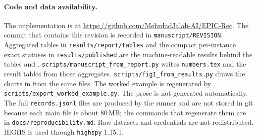 \documentclass[11pt]{article}
\begin{document}
\paragraph{Code and data availability.} The implementation is at
\url{https://github.com/MehrdadJalali-AI/EPIC-Rec}. The commit that contains this revision is recorded in
\texttt{manuscript/REVISION}. Aggregated tables in \texttt{results/report/tables} and the compact per-instance
exact statuses in \texttt{results/published} are the machine-readable results behind the tables and
. \texttt{scripts/manuscript\_from\_report.py} writes \texttt{numbers.tex} and the result tables
from those aggregates. \texttt{scripts/fig1\_from\_results.py} draws the charts in  from the same
files. The worked example is regenerated by \texttt{scripts/export\_worked\_example.py}. The prose is not generated
automatically. The full \texttt{records.jsonl} files are produced by the runner and are not stored in git because
each main file is about 80\,MB; the commands that regenerate them are in \texttt{docs/reproducibility.md}. Raw
datasets and credentials are not redistributed. HiGHS is used through \texttt{highspy} 1.15.1.



\end{document}
